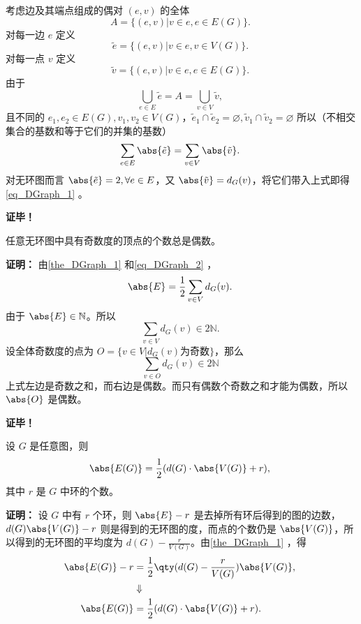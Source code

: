 考虑边及其端点组成的偶对 $(e,v)$ 的全体
\begin{equation}
A=\{(e,v)|v\in e,e\in E(G)\}.~
\end{equation}
对每一边 $e$ 定义
\begin{equation}
\tilde e=\{(e,v)|v\in e,v\in V(G)\}.~
\end{equation}
对每一点 $v$ 定义
\begin{equation}
\tilde v=\{(e,v)|v\in e,e\in E(G)\}.~
\end{equation}
由于 
\begin{equation}
\bigcup_{e\in E}\tilde e=A=\bigcup_{v\in V}\tilde v,~
\end{equation}
且不同的 $e_1,e_2\in E(G),v_1,v_2\in V(G)$，$\tilde e_1\cap\tilde e_2=\varnothing,\tilde v_1\cap\tilde v_2=\varnothing$
所以（不相交集合的基数和等于它们的并集的基数）
\begin{equation}
\sum_{e\in E}\abs{\tilde e}=\sum_{v\in V}\abs{\tilde v}.~
\end{equation}
对无环图而言 $\abs{\tilde e}=2,\forall e\in E$，又 $\abs{\tilde v}=d_G(v)$，将它们带入上式即得\autoref{eq_DGraph_1} 。

\textbf{证毕！}

\begin{corollary}{}
任意无环图中具有奇数度的顶点的个数总是偶数。
\end{corollary}
\textbf{证明：}
由\autoref{the_DGraph_1} 和\autoref{eq_DGraph_2} ，
\begin{equation}
\abs{E}=\frac{1}{2}\sum_{v\in V}d_G(v).~
\end{equation}
由于 $\abs{E}\in\mathbb N$。所以 
\begin{equation}
\sum_{v\in V}d_G(v)\in 2\mathbb N.~
\end{equation}
设全体奇数度的点为 $O=\{v\in V|d_G(v)\text{为奇数}\}$，那么
\begin{equation}
\sum_{v\in O}d_G(v)\in 2\mathbb N~
\end{equation}
上式左边是奇数之和，而右边是偶数。而只有偶数个奇数之和才能为偶数，所以 $\abs{O}$ 是偶数。

\textbf{证毕！}

\begin{corollary}{}
设 $G$ 是任意图，则
\begin{equation}
\abs{E(G)}=\frac{1}{2}(d(G)\cdot\abs{V(G)}+r),~
\end{equation}
其中 $r$ 是 $G$ 中环的个数。
\end{corollary}

\textbf{证明：}
设 $G$ 中有 $r$ 个环，则 $\abs{E}-r$ 是去掉所有环后得到的图的边数，$d(G)\abs{V(G)}-r$ 则是得到的无环图的度，而点的个数仍是 $\abs{V(G)}$，所以得到的无环图的平均度为 $d(G)-\frac{r}{V(G)}$。由\autoref{the_DGraph_1} ，得
\begin{equation}
\begin{aligned}
\abs{E(G)}-r&=\frac{1}{2}\qty(d(G)-\frac{r}{V(G)})\abs{V(G)},\\
&\Downarrow\\
\abs{E(G)}&=\frac{1}{2}(d(G)\cdot\abs{V(G)}+r).
\end{aligned}~
\end{equation}

